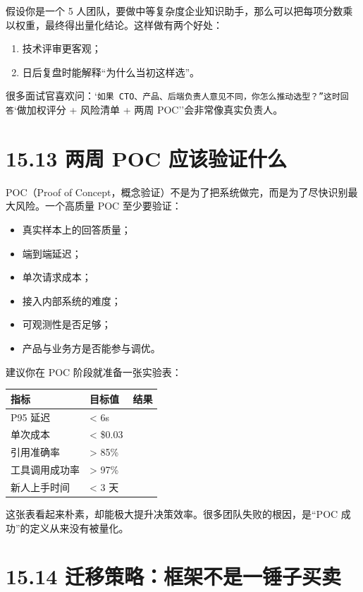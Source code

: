 假设你是一个 5 人团队，要做中等复杂度企业知识助手，那么可以把每项分数乘以权重，最终得出量化结论。这样做有两个好处：


\begin{enumerate}[leftmargin=2em]
\item 技术评审更客观；
\item 日后复盘时能解释``为什么当初这样选''。
\end{enumerate}

很多面试官喜欢问：`\texttt{如果 CTO、产品、后端负责人意见不同，你怎么推动选型？''这时回答}`做加权评分 + 风险清单 + 两周 POC''会非常像真实负责人。


\section{15.13 两周 POC 应该验证什么}

POC（Proof of Concept，概念验证）不是为了把系统做完，而是为了尽快识别最大风险。一个高质量 POC 至少要验证：


\begin{itemize}[leftmargin=2em]
\item 真实样本上的回答质量；
\item 端到端延迟；
\item 单次请求成本；
\item 接入内部系统的难度；
\item 可观测性是否足够；
\item 产品与业务方是否能参与调优。
\end{itemize}

建议你在 POC 阶段就准备一张实验表：


\begingroup
\scriptsize
\setlength{\tabcolsep}{3pt}
\begin{longtable}{|p{}|p{}|p{}|}
\hline
指标 & 目标值 & 结果 \\ \hline
P95 延迟 & < 6s &  \\ \hline
单次成本 & < \$0.03 &  \\ \hline
引用准确率 & > 85\% &  \\ \hline
工具调用成功率 & > 97\% &  \\ \hline
新人上手时间 & < 3 天 &  \\ \hline
\end{longtable}
\endgroup

这张表看起来朴素，却能极大提升决策效率。很多团队失败的根因，是``POC 成功''的定义从来没有被量化。


\section{15.14 迁移策略：框架不是一锤子买卖}

